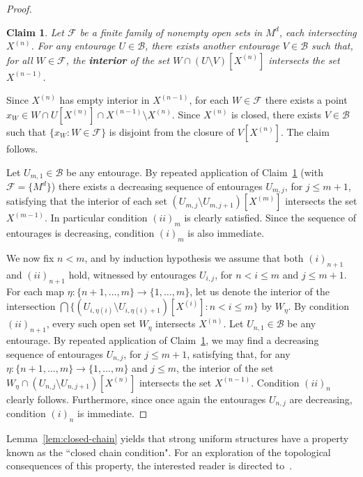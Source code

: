 \documentclass[12pt]{article}
\newcommand{\Bb}{\mathcal{B}}
\newcommand{\Ff}{\mathcal{F}}
\newcommand{\BU}{\Bb} %
\newcommand{\X}[1]{X^{(#1)}}
\newtheorem{claim}{Claim}[theorem]
\theoremstyle{definition}
\theoremstyle{remark}
\newenvironment{claimproof}[1][\proofname]
               {
                 \proof[#1]
                 \renewcommand*\qedsymbol{$\square$\rlap{\textsubscript{Claim}}}
               }
               {
                 \endproof
               }
\begin{document}
\begin{proof}
\begin{claim}\label{claim:UV}
Let $\Ff$ be a finite family of nonempty open sets in $M^d$, each intersecting $\X{n}$. For any entourage $U\in \BU$, there exists another entourage $V\in \BU$ such that, for all $W\in \Ff$, the \textbf{interior} of the set $W \cap (U\setminus V)[\X{n}]$ intersects the set $\X{n-1}$.
\end{claim}
\begin{claimproof}
Since $\X{n}$ has empty interior in $\X{n-1}$, for each $W\in \Ff$ there exists a point $x_W \in W\cap U[\X{n}] \cap  \X{n-1} \setminus \X{n}$. Since $\X{n}$ is closed, there exists $V \in \BU$ such that $\{x_W : W\in \Ff\}$ is disjoint from the closure of $V[\X{n}]$. The claim follows. 
\end{claimproof}

Let $U_{m,1}\in \BU$ be any entourage. By repeated application of Claim~\ref{claim:UV} (with $\Ff=\{M^d\}$) there exists a decreasing sequence of entourages $U_{m,j}$, for $j\leq m+1$, satisfying that the interior of each set $(U_{m,j} \setminus U_{m,j+1})[\X{m}]$ intersects the set $\X{m-1}$. In particular condition $(ii)_m$ is clearly satisfied. Since the sequence of entourages is decreasing, condition $(i)_m$ is also immediate. 

We now fix $n<m$, and by induction hypothesis we assume that both $(i)_{n+1}$ and $(ii)_{n+1}$ hold, witnessed by entourages $U_{i,j}$, for $n<i\leq m$ and $j\leq m+1$. For each map $\eta:\{n+1,\ldots, m\}\rightarrow \{1,\ldots, m\}$, let us denote the interior of the intersection $\bigcap \{(U_{i,\eta(i)} \setminus U_{i,\eta(i)+1})[\X{i}] : n< i\leq m \}$ by $W_\eta$. By condition $(ii)_{n+1}$, every such open set $W_\eta$ intersects $\X{n}$. Let $U_{n,1}\in \BU$ be any entourage. By repeated application of Claim~\ref{claim:UV}, we may find a decreasing sequence of entourages $U_{n,j}$, for $j\leq m+1$, satisfying that, for any $\eta:\{n+1,\ldots, m\}\rightarrow \{1,\ldots, m\}$ and $j\leq m$, the interior of the set $W_\eta \cap (U_{n,j} \setminus U_{n,j+1})[\X{n}]$ intersects the set $\X{n-1}$. Condition $(ii)_n$ clearly follows. Furthermore, since once again the entourages $U_{n,j}$ are decreasing, condition $(i)_n$ is immediate. 
\end{proof}

Lemma~\ref{lem:closed-chain} yields that strong uniform structures have a property known as the ``closed chain condition". For an exploration of the topological consequences of this property, the interested reader is directed to~\cite{wal22-preprint}. 
\end{document}
